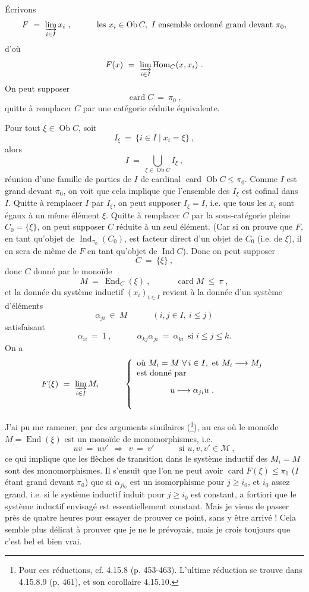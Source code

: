 \documentclass[11pt]{article}
\newcommand{\printedpage}[1]{\marginpar{\footnotesize p.~#1}}
\newcommand{\msp}[1]{\marginpar{\footnotesize [#1]}}
\newcommand{\card}{\operatorname{card}}
\newcommand{\Ob}{\operatorname{Ob}}
\newcommand{\Ind}{\operatorname{Ind}}
\newcommand{\Hom}{\operatorname{Hom}}
\newcommand{\End}{\operatorname{End}}
\newcommand{\cM}{\mathcal{M}}
\begin{document}
Écrivons
\[
F \ = \ \varinjlim_{i\in I} x_i\ , \qquad\quad \text{les } x_i \in \Ob C,\ I \text{ ensemble ordonné grand devant } \pi_0,
\]
d'où
\[
F(x) \ = \ \varinjlim_{i\in I} \Hom_C(x, x_i)\ .
\]
On peut supposer
\[
\card C \ = \ \pi_0\ ,
\]
quitte à remplacer $C$ par une catégorie réduite équivalente.

Pour tout $\xi \in \Ob C$, soit
\[
I_{\xi} \ = \ \{ i \in I \mid x_i = \xi \}\ ,
\]
alors
\[
I \ = \ \bigcup_{\xi\in\Ob C} I_{\xi}\ ,
\]
\msp{page 215}
réunion d'une famille de parties de $I$ de cardinal $\card\Ob C \leqslant \pi_0$. Comme $I$ est grand devant $\pi_0$, on voit que cela implique que l'ensemble des $I_{\xi}$ est cofinal dans $I$. Quitte à remplacer $I$ par $I_{\xi}$, on peut supposer $I_{\xi} = I$, i.e. que tous les $x_i$ sont égaux à un même élément $\xi$. Quitte à remplacer $C$ par la sous-catégorie pleine $C_0 = \{\xi\}$, on peut supposer $C$ réduite à un seul élément. (Car si on prouve que $F$, en tant qu'objet de $\Ind_{\pi_0}(C_0)$, est facteur direct d'un objet de $C_0$ (i.e. de $\xi$), il en sera de même de $F$ en tant qu'objet de $\Ind C$). Donc on peut supposer
\[
C \ = \ \{\xi\}\ ,
\]
donc $C$ donné par le monoïde
\[
M \ = \ \End_C(\xi)\ , \qquad\quad \card M \ \leqslant\ \pi\ ,
\]
et la donnée du système inductif $(x_i)_{i\in I}$ revient à la donnée d'un système d'éléments
\[
\alpha_{ji} \ \in\ M \qquad\quad (i, j \in I,\ i \leqslant j)
\]
\printedpage{77}
satisfaisant
\[
\alpha_{ii} \ = \ 1\ , \qquad\quad \alpha_{kj}\alpha_{ji} \ = \ \alpha_{ki} \ \ \text{si } i \leqslant j \leqslant k.
\]
On a
\[
F(\xi) \ = \ \varinjlim_{i\in I} M_i \qquad\quad
\left\{
\begin{array}{l}
\text{où } M_i = M \ \forall\, i \in I, \text{ et } M_i \longrightarrow M_j \\
\text{est donné par} \\[2ex]
\qquad\qquad u \longmapsto \alpha_{ji}u\ . \\[4ex]
\end{array}
\right.
\]

\msp{page 216}

J'ai pu me ramener, par des arguments similaires (\footnote[92]{Pour ces réductions, cf. 4.15.8 (p. 453-463). L'ultime réduction se trouve dans 4.15.8.9 (p. 461), et son corollaire 4.15.10.}), au cas où le monoïde $M = \End(\xi)$ est un monoïde de monomorphismes, i.e.
\[
uv \ = \ uv' \ \ \Longrightarrow\ \ v \ = \ v' \qquad\quad \text{si } u, v, v' \in \cM\ ,
\] %
ce qui implique que les flèches de transition dans le système inductif des $M_i = M$ sont des monomorphismes. Il s'ensuit que l'on ne peut avoir $\card F(\xi) \leqslant \pi_0$ ($I$ étant grand devant $\pi_0$) que si $\alpha_{ji_0}$ est un isomorphisme pour $j \geqslant i_0$, et $i_0$ assez grand, i.e. si le système inductif induit pour $j \geqslant i_0$ est constant, a fortiori que le système inductif envisagé est essentiellement constant. Mais je viens de passer près de quatre heures pour essayer de prouver ce point, sans y être arrivé ! Cela semble plus délicat à prouver que je ne le prévoyais, mais je crois toujours que c'est bel et bien vrai.
\end{document}
